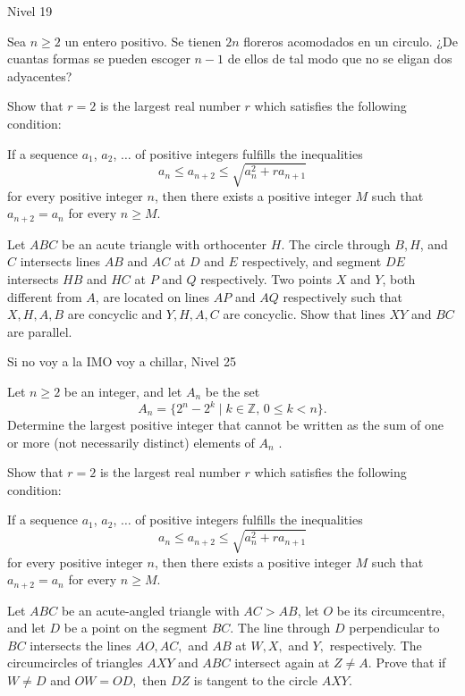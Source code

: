 \documentclass[12pt]{article}
\begin{document}
\begin{examen}{Nivel 19}{}
      \begin{problema}
        Sea $n\geq 2$ un entero positivo. Se tienen $2n$ floreros acomodados en un circulo. ¿De cuantas formas se pueden escoger $n-1$ de ellos de tal modo que no se eligan dos adyacentes?
    \end{problema}
    
       \begin{problema}
        	Show that $r = 2$ is the largest real number $r$ which satisfies the following condition:

If a sequence $a_1$, $a_2$, $\ldots$ of positive integers fulfills the inequalities
\[a_n \leq a_{n+2} \leq\sqrt{a_n^2+ra_{n+1}}\]for every positive integer $n$, then there exists a positive integer $M$ such that $a_{n+2} = a_n$ for every $n \geq M$.
    \end{problema}

     \begin{problema}
        Let $ABC$ be an acute triangle with orthocenter $H$. The circle through $B, H$, and $C$ intersects lines $AB$ and $AC$ at $D$ and $E$ respectively, and segment $DE$ intersects $HB$ and $HC$ at $P$ and $Q$ respectively. Two points $X$ and $Y$, both different from $A$, are located on lines $AP$ and $AQ$ respectively such that $X, H, A, B$ are concyclic and $Y, H, A, C$ are concyclic. Show that lines $XY$ and $BC$ are parallel.
    \end{problema}
\end{examen}

\begin{examen}{Si no voy a la IMO voy a chillar, Nivel 25}{}
    \begin{problema}
  	Let $n \ge 2$ be an integer, and let $A_n$ be the set\[A_n = \{2^n  - 2^k\mid k \in \mathbb{Z},\, 0 \le k < n\}.\]Determine the largest positive integer that cannot be written as the sum of one or more (not necessarily distinct) elements of $A_n$ .
    \end{problema}
    
    \begin{problema}
        	Show that $r = 2$ is the largest real number $r$ which satisfies the following condition:

If a sequence $a_1$, $a_2$, $\ldots$ of positive integers fulfills the inequalities
\[a_n \leq a_{n+2} \leq\sqrt{a_n^2+ra_{n+1}}\]for every positive integer $n$, then there exists a positive integer $M$ such that $a_{n+2} = a_n$ for every $n \geq M$.
    \end{problema}
    
    \begin{problema}
     Let $ABC$ be an acute-angled triangle with $AC > AB$, let $O$ be its circumcentre, and let $D$ be a point on the segment $BC$. The line through $D$ perpendicular to $BC$ intersects the lines $AO, AC,$ and $AB$ at $W, X,$ and $Y,$ respectively. The circumcircles of triangles $AXY$ and $ABC$ intersect again at $Z \ne A$.
Prove that if $W \ne D$ and $OW = OD,$ then $DZ$ is tangent to the circle $AXY.$
    \end{problema}
    
\end{examen}
\end{document}
